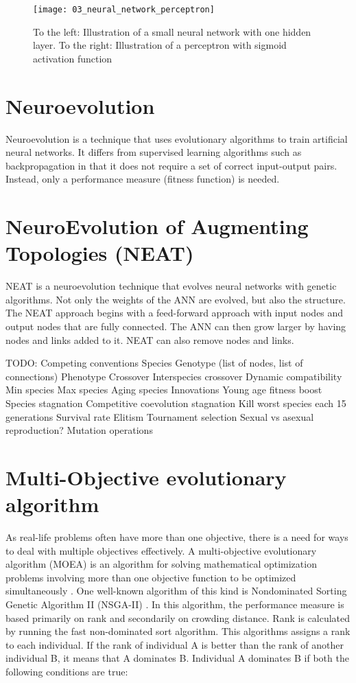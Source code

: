 \begin{figure}[h]
    \centering
    \texttt{[image: 03\_neural\_network\_perceptron]}
    \caption{To the left: Illustration of a small neural network with one hidden layer. To the right: Illustration of a perceptron with sigmoid activation function}
    \label{fig:neural_network_perceptron}
\end{figure}

\section{Neuroevolution}
Neuroevolution is a technique that uses evolutionary algorithms to train artificial neural networks. It differs from supervised learning algorithms such as backpropagation in that it does not require a set of correct input-output pairs. Instead, only a performance measure (fitness function) is needed.

\section{NeuroEvolution of Augmenting Topologies (NEAT)}
NEAT \citep{stanley2002} is a neuroevolution technique that evolves neural networks with genetic algorithms. Not only the weights of the ANN are evolved, but also the structure. The NEAT approach begins with a feed-forward approach with input nodes and output nodes that are fully connected. The ANN can then grow larger by having nodes and links added to it. NEAT can also remove nodes and links.

TODO:
Competing conventions
Species
Genotype (list of nodes, list of connections)
Phenotype
Crossover
Interspecies crossover
Dynamic compatibility
Min species
Max species
Aging species
Innovations
Young age fitness boost
Species stagnation
Competitive coevolution stagnation
Kill worst species each 15 generations
Survival rate
Elitism
Tournament selection
Sexual vs asexual reproduction?
Mutation operations

\section{Multi-Objective evolutionary algorithm}
As real-life problems often have more than one objective, there is a need for ways to deal with multiple objectives effectively. A multi-objective evolutionary algorithm (MOEA) is an algorithm for solving mathematical optimization problems involving more than one objective function to be optimized simultaneously \citep{veldhuizen2000}. One well-known algorithm of this kind is Nondominated Sorting Genetic Algorithm II (NSGA-II) \citep{nsga2}. In this algorithm, the performance measure is based primarily on rank and secondarily on crowding distance. Rank is calculated by running the fast non-dominated sort algorithm. This algorithms assigns a rank to each individual. If the rank of individual A is better than the rank of another individual B, it means that A dominates B. Individual A dominates B if both the following conditions are true:

